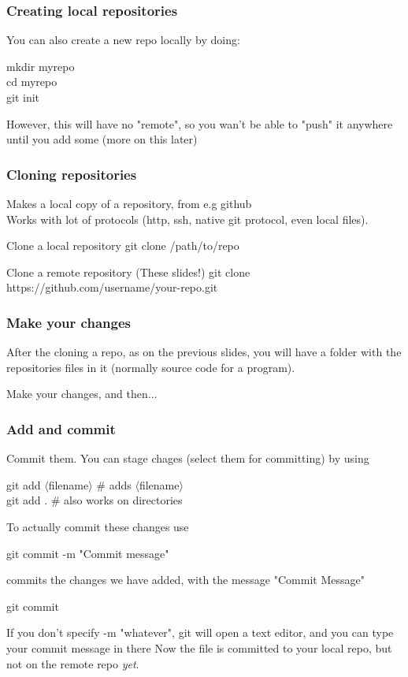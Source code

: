 \documentclass[xcolor=dvipsnames]{beamer}
\begin{document}
\begin{frame}
    \frametitle{Creating local repositories}

    You can also create a new repo locally by doing:
    \begin{block}{}
        mkdir myrepo\\
        cd myrepo\\
        git init
    \end{block}
    However, this will have no "remote", so you wan't be able to "push" it anywhere until you add some (more on this later)
\end{frame}

\begin{frame}
    \frametitle{Cloning repositories}
    Makes a local copy of a repository, from e.g github\\
    Works with lot of protocols (http, ssh, native git protocol, even local files).

    \begin{block}{Clone a local repository}
        git clone /path/to/repo
    \end{block}
    \begin{block}{Clone a remote repository (These slides!)}
        git clone https://github.com/username/your-repo.git
    \end{block}
\end{frame}

\begin{frame}
    \frametitle{Make your changes}
    After the cloning a repo, as on the previous slides, you will have a folder with the repositories
    files in it (normally source code for a program).

    Make your changes, and then...
\end{frame}

\begin{frame}
    \frametitle{Add and commit}
    Commit them.
    You can stage chages (select them for committing) by using
    \begin{block}{}
        git add $\langle$filename$\rangle$ \# adds $\langle$filename$\rangle$\\
        git add . \# also works on directories
    \end{block}
    To actually commit these changes use
    \begin{block}{}
        git commit -m "Commit message"
    \end{block}
    commits the changes we have added, with the message "Commit Message"\\
    
    \begin{block}{}    
        git commit
    \end{block}
     If you don't specify -m "whatever", git will open a text editor, and you can type your commit message in there 
    Now the file is committed to your local repo, but not on the remote repo \emph{yet}.
\end{frame}
\end{document}
